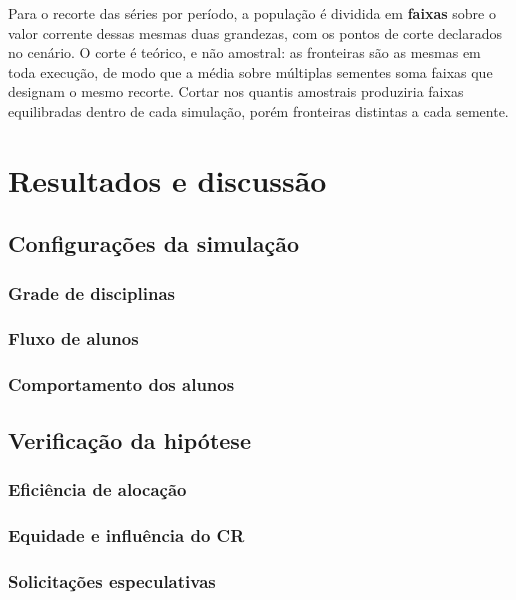 \documentclass[
    12pt,
    openany,
    oneside,
    a4paper,
    english,
    brazil
]{abntex2}
\begin{document}
Para o recorte das séries por período, a população é dividida em \textbf{faixas} sobre o valor corrente dessas mesmas duas grandezas, com os pontos de corte declarados no cenário. O corte é teórico, e não amostral: as fronteiras são as mesmas em toda execução, de modo que a média sobre múltiplas sementes soma faixas que designam o mesmo recorte. Cortar nos quantis amostrais produziria faixas equilibradas dentro de cada simulação, porém fronteiras distintas a cada semente.

\chapter{Resultados e discussão}

\section{Configurações da simulação}

\subsection{Grade de disciplinas}

\subsection{Fluxo de alunos}

\subsection{Comportamento dos alunos}

\section{Verificação da hipótese}

\subsection{Eficiência de alocação}

\subsection{Equidade e influência do CR}

\subsection{Solicitações especulativas}
\end{document}
